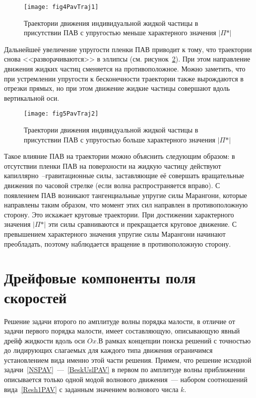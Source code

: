 \begin{figure}[ht]
\centering
\texttt{[image: fig4PavTraj1]}
\caption{Траектории движения индивидуальной жидкой частицы в присутствии ПАВ с упругостью  меньше характерного значения $ \vert \Pi* \vert $ }\label{fig:PavTraj1}
\end{figure} 

Дальнейшеё увеличение упругости пленки ПАВ приводит к тому, что траектории снова <<разворачиваются>> в эллипсы (см. рисунок~\ref{fig:PavTraj2}). При этом направление движения жидких частиц сменяется на противоположное. Можно заметить, что при устремлении упругости к бесконечности траектории также вырождаются в отрезки прямых, но при этом движение жидкие частицы совершают вдоль вертикальной оси.

\begin{figure}[ht]
\centering
\texttt{[image: fig5PavTraj2]}
\caption{Траектории движения индивидуальной жидкой частицы в присутствии ПАВ с упругостью  больше характерного значения $ \vert \Pi* \vert $ }\label{fig:PavTraj2}
\end{figure} 

Такое влияние ПАВ на траектории можно объяснить следующим образом: в отсутствии пленки ПАВ на поверхности на жидкую частицу действуют капиллярно~--гравитационные силы, заставляющие её совершать вращательные движения по часовой стрелке (если волна распространяется вправо). С появлением ПАВ возникают тангенциальные упругие силы Марангони, которые направлены таким образом, что момент этих сил направлен в противоположную сторону. Это искажает круговые траектории. При достижении характерного значения $ \vert \Pi* \vert $ эти силы сравниваются и прекращается круговое движение. С превышением характерного значения упругие силы Марангони начинают преобладать, поэтому наблюдается вращение в противоположную сторону. 

\section{Дрейфовые компоненты поля скоростей}	

Решение задачи второго по амплитуде волны порядка малости, в отличие от задачи первого порядка малости, имеет составляющую, описывающую явный дрейф жидкости вдоль оси $ Ox $.В рамках концепции поиска решений с точностью до лидирующих слагаемых для каждого типа движения ограничимся установлением вида именно этой части решения.  Примем, что решение исходной задачи~\eqref{NSPAV}~---~\eqref{BeskUslPAV} в первом по амплитуде волны приближении описывается только одной модой волнового движения~--- набором соотношений вида~\eqref{Resh1PAV} с заданным значением волнового числа $ k $. 

